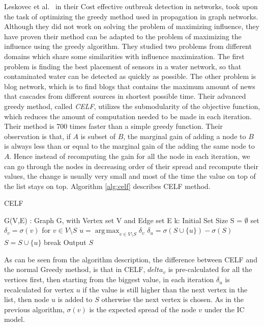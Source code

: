 \documentclass[english]{tktltiki}
\DeclareMathOperator*{\argmax}{arg\,max}
\begin{document}
Leskovec et al.\ \cite{leskovec07}  in their Cost effective outbreak detection in networks, took upon the task of optimizing the greedy method used in propagation in graph networks. Although they did not work on solving the problem of maximizing influence, they have proven their method can be adapted to the problem of maximizing the influence using the greedy algorithm. They studied two problems from different domains which share some similarities with influence maximization. The first problem is finding the best placement of sensors in a water network, so that contaminated water can be detected as quickly as possible. The other problem is blog network, which is to find blogs that contains the maximum amount of news that cascades from different sources in shortest possible time. Their advanced greedy method, called \textit{CELF}, utilizes the submodularity of the objective function, which reduces the amount of computation needed to be made in each iteration. Their method is 700 times faster than a simple greedy function. 
Their observation is that, if $A$ is subset of $B$, the marginal gain of adding a node to $B$ is always less than or equal to the marginal gain of the adding the same node to $A$. Hence instead of recomputing the gain for all the node in each iteration, we can go through the nodes in decreasing order of their spread and recompute their values, the change is usually very small and most of the time the value on top of the list stays on top. Algorithm \ref{alg:celf} describes CELF method.
\begin{algorithm}[ht!]
\caption{CELF}
\label{alg:celf}
\begin{algorithmic}
\Require G(V,E) : Graph G, with Vertex set V and Edge set E
\Require k: Initial Set Size
\State S = $\emptyset$
	\State set $\delta_v = \sigma(v)$ for $v \in V \setminus S$
		\State $u =  \argmax_{v \in V \setminus S}\delta_v$ 
		\State $\delta_u = \sigma( S \cup \{u\}) - \sigma(S)$
			\State $S = S \cup \{u\}$
			\State break
		\EndIf
	\EndWhile 
\EndFor
\State Output $S$
\end{algorithmic}
\end{algorithm}
As can be seen from the algorithm description, the difference between CELF and the normal Greedy method, is that in CELF, $delta_v$ is pre-calculated for all the vertices first, then starting from the biggest value, in each iteration $\delta_u$ is recalculated for vertex $u$ if the value is still higher than the next vertex in the list, then node $u$ is added to $S$ otherwise the next vertex is chosen. As in the previous algorithm, $\sigma(v)$ is the expected spread of the node $v$ under the IC model. 
\end{document}

